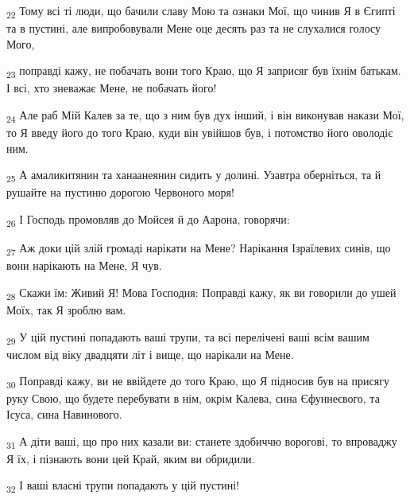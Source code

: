 \begin{tcolorbox}
\textsubscript{22} Тому всі ті люди, що бачили славу Мою та ознаки Мої, що чинив Я в Єгипті та в пустині, але випробовували Мене оце десять раз та не слухалися голосу Мого,
\end{tcolorbox}
\begin{tcolorbox}
\textsubscript{23} поправді кажу, не побачать вони того Краю, що Я заприсяг був їхнім батькам. І всі, хто зневажає Мене, не побачать його!
\end{tcolorbox}
\begin{tcolorbox}
\textsubscript{24} Але раб Мій Калев за те, що з ним був дух інший, і він виконував накази Мої, то Я введу його до того Краю, куди він увійшов був, і потомство його оволодіє ним.
\end{tcolorbox}
\begin{tcolorbox}
\textsubscript{25} А амаликитянин та ханаанеянин сидить у долині. Узавтра оберніться, та й рушайте на пустиню дорогою Червоного моря!
\end{tcolorbox}
\begin{tcolorbox}
\textsubscript{26} І Господь промовляв до Мойсея й до Аарона, говорячи:
\end{tcolorbox}
\begin{tcolorbox}
\textsubscript{27} Аж доки цій злій громаді нарікати на Мене? Нарікання Ізраїлевих синів, що вони нарікають на Мене, Я чув.
\end{tcolorbox}
\begin{tcolorbox}
\textsubscript{28} Скажи їм: Живий Я! Мова Господня: Поправді кажу, як ви говорили до ушей Моїх, так Я зроблю вам.
\end{tcolorbox}
\begin{tcolorbox}
\textsubscript{29} У цій пустині попадають ваші трупи, та всі перелічені ваші всім вашим числом від віку двадцяти літ і вище, що нарікали на Мене.
\end{tcolorbox}
\begin{tcolorbox}
\textsubscript{30} Поправді кажу, ви не ввійдете до того Краю, що Я підносив був на присягу руку Свою, що будете перебувати в нім, окрім Калева, сина Єфуннеєвого, та Ісуса, сина Навинового.
\end{tcolorbox}
\begin{tcolorbox}
\textsubscript{31} А діти ваші, що про них казали ви: станете здобиччю ворогові, то впроваджу Я їх, і пізнають вони цей Край, яким ви обридили.
\end{tcolorbox}
\begin{tcolorbox}
\textsubscript{32} І ваші власні трупи попадають у цій пустині!
\end{tcolorbox}
